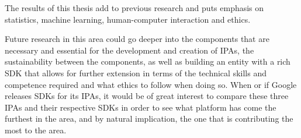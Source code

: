 \documentclass[preprint,12pt]{elsarticle}
\begin{document}
The results of this thesis add to previous research and puts emphasis on statistics, machine learning, human-computer interaction and ethics.

Future research in this area could go deeper into the components that are necessary and essential for the development and creation of IPAs, the sustainability between the components, as well as building an entity with a rich SDK that allows for further extension in terms of the technical skills and competence required and what ethics to follow when doing so. When or if Google releases SDKs for its IPAs, it would be of great interest to compare these three IPAs and their respective SDKs in order to see what platform has come the furthest in the area, and by natural implication, the one that is contributing the most to the area.
\newpage








\nocite{*}








\end{document}
